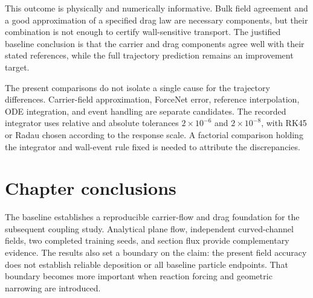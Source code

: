 This outcome is physically and numerically informative. Bulk field
agreement and a good approximation of a specified drag law are necessary
components, but their combination is not enough to certify wall-sensitive
transport. The justified baseline conclusion is that the carrier and drag
components agree well with their stated references, while the full
trajectory prediction remains an improvement target.

The present comparisons do not isolate a single cause for the trajectory
differences. Carrier-field approximation, ForceNet error, reference
interpolation, ODE integration, and event handling are separate candidates.
The recorded integrator uses relative and absolute tolerances
$2\times10^{-6}$ and $2\times10^{-8}$, with RK45 or Radau chosen according
to the response scale. A factorial comparison holding the integrator and
wall-event rule fixed is needed to attribute the discrepancies.

\section{Chapter conclusions}
The baseline establishes a reproducible carrier-flow and drag foundation
for the subsequent coupling study. Analytical plane flow, independent
curved-channel fields, two completed training seeds, and section flux
provide complementary evidence. The results also set a boundary on the
claim: the present field accuracy does not establish reliable deposition
or all baseline particle endpoints. That boundary becomes more important
when reaction forcing and geometric narrowing are introduced.
